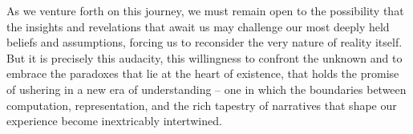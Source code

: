 \documentclass{article}
\begin{document}
As we venture forth on this journey, we must remain open to the possibility that the insights and revelations that await us may challenge our most deeply held beliefs and assumptions, forcing us to reconsider the very nature of reality itself. But it is precisely this audacity, this willingness to confront the unknown and to embrace the paradoxes that lie at the heart of existence, that holds the promise of ushering in a new era of understanding – one in which the boundaries between computation, representation, and the rich tapestry of narratives that shape our experience become inextricably intertwined.


 
\end{document}

